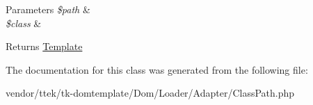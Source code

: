 \begin{DoxyParams}{Parameters}
{\em \$path} & \\
\hline
{\em \$class} & \\
\hline
\end{DoxyParams}
\begin{DoxyReturn}{Returns}
\hyperlink{classDom_1_1Template}{Template} 
\end{DoxyReturn}


The documentation for this class was generated from the following file\+:\begin{DoxyCompactItemize}
\item 
vendor/ttek/tk-\/domtemplate/\+Dom/\+Loader/\+Adapter/Class\+Path.\+php\end{DoxyCompactItemize}
